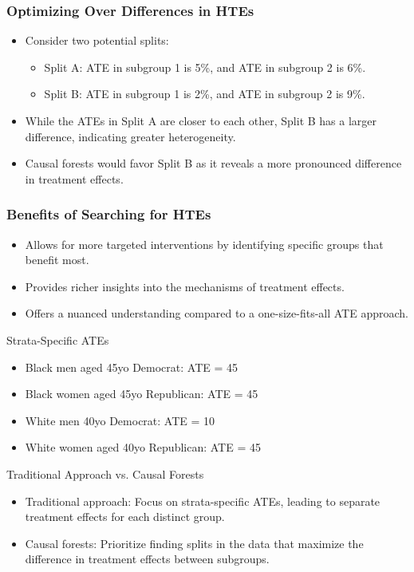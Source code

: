 \documentclass{beamer}
\begin{document}
\begin{frame}
\frametitle{Optimizing Over Differences in HTEs}
\begin{itemize}
\item Consider two potential splits: 
  \begin{itemize}
  \item Split A: ATE in subgroup 1 is 5\%, and ATE in subgroup 2 is 6\%.
  \item Split B: ATE in subgroup 1 is 2\%, and ATE in subgroup 2 is 9\%.
  \end{itemize}
\item While the ATEs in Split A are closer to each other, Split B has a larger difference, indicating greater heterogeneity.
\item Causal forests would favor Split B as it reveals a more pronounced difference in treatment effects.
\end{itemize}
\end{frame}

\begin{frame}
\frametitle{Benefits of Searching for HTEs}
\begin{itemize}
\item Allows for more targeted interventions by identifying specific groups that benefit most.
\item Provides richer insights into the mechanisms of treatment effects.
\item Offers a nuanced understanding compared to a one-size-fits-all ATE approach.
\end{itemize}
\end{frame}


\begin{frame}{Strata-Specific ATEs}
\begin{itemize}
    \item Black men aged 45yo Democrat: ATE = 45
    \item Black women aged 45yo Republican: ATE = 45
    \item White men 40yo Democrat: ATE = 10
    \item White women aged 40yo Republican: ATE = 45
\end{itemize}
\end{frame}


\begin{frame}{Traditional Approach vs. Causal Forests}
\begin{itemize}
    \item Traditional approach: Focus on strata-specific ATEs, leading to separate treatment effects for each distinct group.
    \item Causal forests: Prioritize finding splits in the data that maximize the difference in treatment effects between subgroups.
\end{itemize}
\end{frame}
\end{document}
